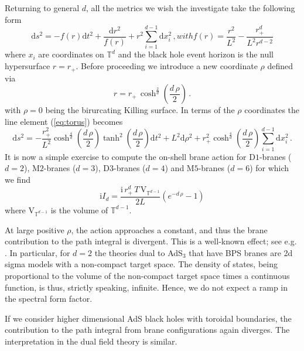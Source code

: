 \documentclass[11pt]{article}
\renewcommand{\i}{\mathrm{i}}
\begin{document}
Returning to general $d$, all the metrics we wish the investigate take the following form
\begin{subequations}
\begin{equation}
\mathrm{d}s^2=-f(r)\mathrm{d}t^2+\frac{\mathrm{d}r^2}{f(r)}+r^2 \sum_{i=1}^{d-1}\mathrm{d}x_i^2\,,
\label{eq:torus}
\end{equation}
with
\begin{equation}
f(r)=\frac{r^2}{L^2}-\frac{r_+^{d}}{L^2 r^{d-2}}
\end{equation}
\end{subequations}
where $x_i$ are coordinates on $\mathbb{T}^d$ and the black hole event horizon is the null hypersurface $r=r_+$. Before proceeding we introduce a new coordinate $\rho$ defined via
\begin{equation}
r = r_+\,\cosh ^{\frac{2}{d}}\left(\frac{d\,\rho }{2}\right)\,.
\end{equation}
with $\rho=0$ being the birurcating Killing surface. 
In terms of the $\rho$ coordinates the line element (\ref{eq:torus}) becomes
\begin{equation}
\mathrm{d}s^2=-\frac{r_+^2}{L^2} \cosh ^{\frac{4}{d}}\left(\frac{d\,\rho }{2}\right) \tanh ^2\left(\frac{d\,\rho }{2}\right) \mathrm{d}t^2+L^2\mathrm{d}\rho^2+r_+^2 \cosh ^{\frac{4}{d}}\left(\frac{d\,\rho }{2}\right) \sum_{i=1}^{d-1}\mathrm{d}x_i^2\,.
\end{equation}
It is now a simple exercise to compute the on-shell brane action for D$1$-branes ($d=2$), M$2$-branes ($d=3$), D$3$-branes ($d=4$) and M$5$-branes ($d=6$) for which we find
\begin{equation}
\i I_{d}=\frac{\i\,r_+^d\,T\,\mathrm{V}_{\mathbb{T}^{d-1}}}{2 L}\left(e^{-d\,\rho }-1\right)
\end{equation}
where $\mathrm{V}_{\mathbb{T}^{d-1}}$ is the volume of $\mathbb{T}^{d-1}$.

At large positive $\rho$, the action approaches a constant, and thus the brane contribution to the path integral is divergent. 
This is a well-known effect; see e.g. \cite{Maldacena:1998uz,Seiberg:1999xz,Maldacena:2000hw}. 
In particular, for $d=2$ the theories dual to AdS$_3$ that have BPS branes are 2d sigma models with a non-compact target space.
The density of states, being proportional to the volume of the non-compact target space times a continuous function, is thus, strictly speaking, infinite.
Hence, we do not expect a ramp in the spectral form factor.

If we consider higher dimensional AdS black holes with toroidal boundaries, the contribution to the path integral from brane configurations again diverges.  
The interpretation in the dual field theory is similar.




\end{document}
